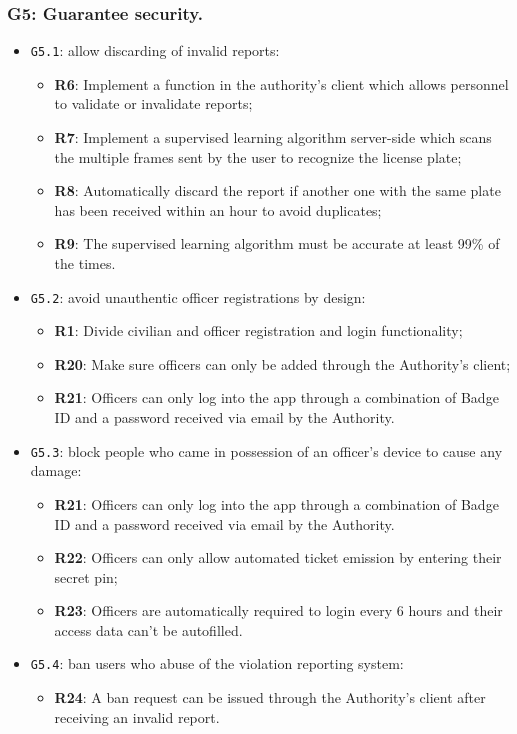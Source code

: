 \documentclass[12pt,a4paper]{article}
\begin{document}
\subsubsection{G5: Guarantee security.}
	
	\begin{itemize}
	\item \texttt{G5.1}: allow discarding of invalid reports:
							\begin{itemize}
									\item \textbf{R6}: Implement a function in the authority's client which allows personnel to validate or invalidate reports;
									\item \textbf{R7}: Implement a supervised learning algorithm server-side which scans the multiple frames sent by the user to recognize the license plate;
									\item \textbf{R8}: Automatically discard the report if another one with the same plate has been received within an hour to avoid duplicates;
									\item \textbf{R9}: The supervised learning algorithm must be accurate at least 99\% of the times.
							\end{itemize}
	\item \texttt{G5.2}: avoid unauthentic officer registrations by design:
							\begin{itemize}
									\item \textbf{R1}: Divide civilian and officer registration and login functionality;
									\item \textbf{R20}: Make sure officers can only be added through the Authority's client;
									\item \textbf{R21}: Officers can only log into the app through a combination of Badge ID and a password received via email by the Authority.
							\end{itemize}
	\item \texttt{G5.3}: block people who came in possession of an officer's device to cause any damage:
							\begin{itemize}
									\item \textbf{R21}: Officers can only log into the app through a combination of Badge ID and a password received via email by the Authority.
									\item \textbf{R22}: Officers can only allow automated ticket emission by entering their secret pin;
									\item \textbf{R23}: Officers are automatically required to login every 6 hours and their access data can't be autofilled.
							\end{itemize}
	\item \texttt{G5.4}: ban users who abuse of the violation reporting system:
							\begin{itemize}
									\item \textbf{R24}: A ban request can be issued through the Authority's client after receiving an invalid report.
							\end{itemize}
	\end{itemize}
	
\end{document}
